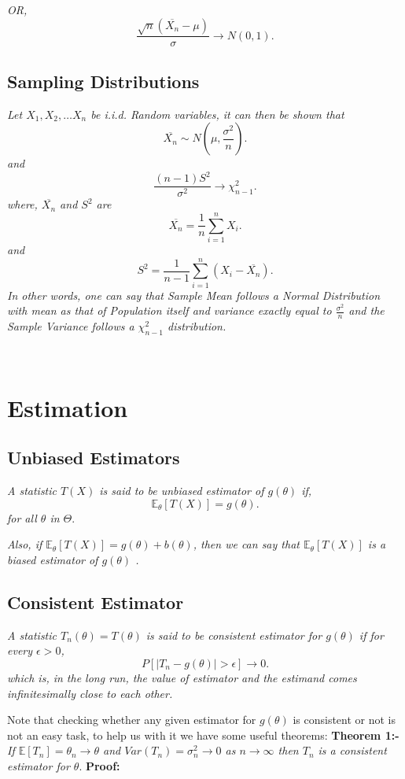 \documentclass[a4paper]{article}
\begin{document}
\textit{OR,}
\[
	\frac{\sqrt{n} \left( \overline{X_n}- \mu \right) }{\sigma} \to N(0,1)
.\] 


\subsection{Sampling Distributions}
\textit{Let $X_1, X_2, \dots X_n$ be i.i.d. Random variables, it can then be shown that}
\[
	\overline{X_n} \sim N(\mu,\frac{\sigma^2}{n})
.\] 	
\textit{and}
\[
	\frac{\left( n-1 \right) S^2}{\sigma^2} \to  \chi^2_{n-1}
.\]
\textit{where, $\overline{X_n}$ and $S^2$ are}
\[
	\overline{X_n} = \frac{1}{n}\sum_{i = 1}^{n} X_i
.\] 	
\textit{and}	
\[
	S^2 = \frac{1}{n-1} \sum_{i = 1}^{n} \left( X_i - \overline{X_n}\right) 
.\]
\textit{In other words, one can say that Sample Mean follows a Normal Distribution with mean as that of Population itself and variance exactly equal to $\frac{\sigma^2}{n}$ and the Sample Variance follows a $\chi^2_{n-1}$ distribution.}

\


\section{Estimation}

\subsection{Unbiased Estimators}
\textit{A statistic $T(X)$ is said to be unbiased estimator of $g(\theta)$ if,}
\[
	\mathbb{E}_\theta \left[ T(X)  \right] = g(\theta) 
.\] 
\textit{for all $\theta$ in  $\Theta$}.

\textit{Also, if $\mathbb{E}_\theta \left[ T(X) \right]  = g(\theta) + b(\theta)$, then we can say that  $\mathbb{E}_\theta [T(X)]$ is a biased estimator of $g(\theta)$ .}


\subsection{Consistent Estimator}
\textit{A statistic $T_n(\theta) = T(\theta)$ is said to be consistent estimator for $g(\theta)$ if for every $\epsilon > 0$,}
\[
	P\left[  \mid T_n - g(\theta)  \mid  > \epsilon \right] \to  0 
.\] 
\textit{which is, in the long run, the value of estimator and the estimand comes infinitesimally close to each other.}

Note that checking whether any given estimator for $g(\theta)$ is consistent or not is not an easy task, to help us with it we have some useful theorems:
\newline\newline\newline
\textbf{Theorem 1:-} 
\textit{If $\mathbb{E} \left[ T_n \right]  = \theta_n \to  \theta$ and $Var(T_n) = \sigma^2_n \to  0$ as $n \to \infty$ then $T_n$ is a consistent estimator for $\theta$}.
\newline\newline
\textbf{Proof:}
\end{document}
